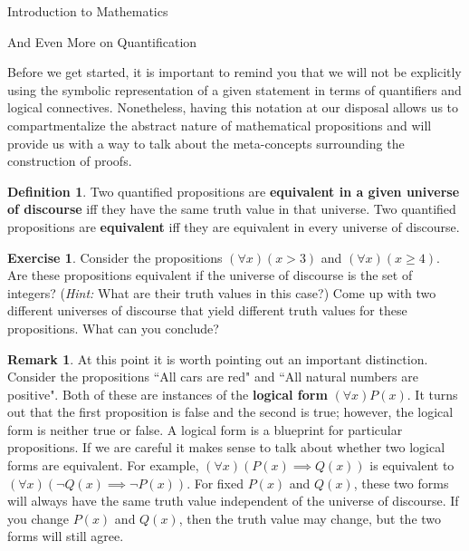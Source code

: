 \documentclass[11pt]{article}
\theoremstyle{definition}
\newtheorem{definition}[theorem]{Definition}
\newtheorem{exercise}[theorem]{Exercise}
\newtheorem{remark}[theorem]{Remark}
\begin{document}
\addtocounter{section}{0}

\begin{section}{Introduction to Mathematics}

\addtocounter{subsection}{5}
\addtocounter{theorem}{80}


\begin{subsection}{And Even More on Quantification}

Before we get started, it is important to remind you that we will not be explicitly using the symbolic representation of a given statement in terms of quantifiers and logical connectives.  Nonetheless, having this notation at our disposal allows us to compartmentalize the abstract nature of mathematical propositions and will provide us with a way to talk about the meta-concepts surrounding the construction of proofs.

\begin{definition}
Two quantified propositions are \textbf{equivalent in a given universe of discourse} iff they have the same truth value in that universe.  Two quantified propositions are \textbf{equivalent} iff they are equivalent in every universe of discourse.
\end{definition}

\begin{exercise}
Consider the propositions $(\forall x)(x>3)$ and $(\forall x)(x\geq 4)$.  Are these propositions equivalent if the universe of discourse is the set of integers?  (\emph{Hint:}  What are their truth values in this case?)  Come up with two different universes of discourse that yield different truth values for these propositions.  What can you conclude?
\end{exercise}

\begin{remark}
At this point it is worth pointing out an important distinction.  Consider the propositions ``All cars are red" and ``All natural numbers are positive".  Both of these are instances of the \textbf{logical form} $(\forall x)P(x)$.  It turns out that the first proposition is false and the second is true; however, the logical form is neither true or false.  A logical form is a blueprint for particular propositions.  If we are careful it makes sense to talk about whether two logical forms are equivalent.  For example, $(\forall x)(P(x)\implies Q(x))$ is equivalent to $(\forall x)(\neg Q(x)\implies \neg P(x))$.  For fixed $P(x)$ and $Q(x)$, these two forms will always have the same truth value independent of the universe of discourse.  If you change $P(x)$ and $Q(x)$, then the truth value may change, but the two forms will still agree.
\end{remark}


\end{subsection}
\end{section}
\end{document}
